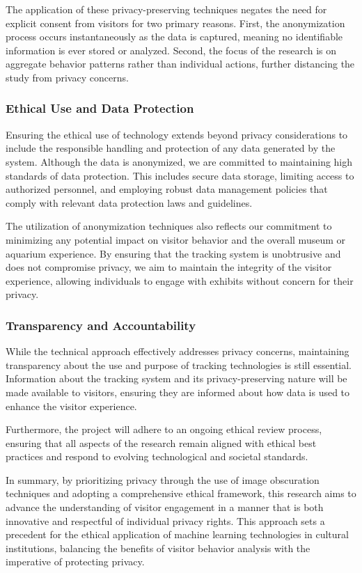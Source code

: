 The application of these privacy-preserving techniques negates the need for explicit consent from visitors for two primary reasons. First, the anonymization process occurs instantaneously as the data is captured, meaning no identifiable information is ever stored or analyzed. Second, the focus of the research is on aggregate behavior patterns rather than individual actions, further distancing the study from privacy concerns.

\subsubsection{Ethical Use and Data Protection}
Ensuring the ethical use of technology extends beyond privacy considerations to include the responsible handling and protection of any data generated by the system. Although the data is anonymized, we are committed to maintaining high standards of data protection. This includes secure data storage, limiting access to authorized personnel, and employing robust data management policies that comply with relevant data protection laws and guidelines.

The utilization of anonymization techniques also reflects our commitment to minimizing any potential impact on visitor behavior and the overall museum or aquarium experience. By ensuring that the tracking system is unobtrusive and does not compromise privacy, we aim to maintain the integrity of the visitor experience, allowing individuals to engage with exhibits without concern for their privacy.

\subsubsection{Transparency and Accountability}
While the technical approach effectively addresses privacy concerns, maintaining transparency about the use and purpose of tracking technologies is still essential. Information about the tracking system and its privacy-preserving nature will be made available to visitors, ensuring they are informed about how data is used to enhance the visitor experience.

Furthermore, the project will adhere to an ongoing ethical review process, ensuring that all aspects of the research remain aligned with ethical best practices and respond to evolving technological and societal standards.

In summary, by prioritizing privacy through the use of image obscuration techniques and adopting a comprehensive ethical framework, this research aims to advance the understanding of visitor engagement in a manner that is both innovative and respectful of individual privacy rights. This approach sets a precedent for the ethical application of machine learning technologies in cultural institutions, balancing the benefits of visitor behavior analysis with the imperative of protecting privacy.

